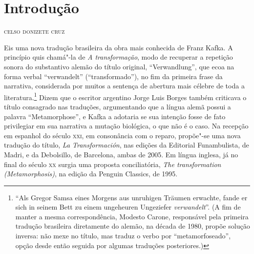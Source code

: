 
\chapter*{Introdução}



\begin{flushright}
\textsc{celso donizete cruz}
\end{flushright}


\noindent{}Eis uma nova tradução brasileira da obra mais conhecida de Franz Kafka.
A princípio quis chamá"-la de \textit{A transformação}, modo de
recuperar a repetição sonora do substantivo alemão do título original,
“Verwandlung”, que ecoa na forma verbal “verwandelt” (“transformado”),
no fim da primeira frase da narrativa, considerada por muitos a
sentença de abertura mais célebre de toda a literatura.\footnote{ “Als 
Gregor Samsa eines Morgens aus unruhigen
Träumen erwachte, fande er sich in seinem Bett zu einem ungeheuren
Ungeziefer \textit{verwandelt}”. (A fim de manter a mesma
correspondência, Modesto Carone, responsável pela primeira tradução
brasileira diretamente do alemão, na década de 1980,
propõe solução inversa: não mexe no título, mas traduz o verbo por
“metamorfoseado”, opção desde então seguida por algumas traduções
posteriores.)} Dizem que o escritor argentino Jorge Luis Borges também
criticava o título consagrado nas traduções, argumentando que a língua
alemã possui a palavra “Metamorphose”, e Kafka a adotaria se sua
intenção fosse de fato privilegiar em sua narrativa a mutação
biológica, o que não é o caso. Na recepção em espanhol do século \textsc{xxi}, em
consonância com o reparo, propõe"-se uma nova tradução do título,
\textit{La Transformación}, nas edições da Editorial Funambulista, de
Madri, e da Debolsillo, de Barcelona, ambas de 2005. Em língua inglesa,
já no final do século \textsc{xx} surgia uma proposta conciliatória, \textit{The
transformation (Metamorphosis)}, na edição da Penguin Classics, de
1995.

